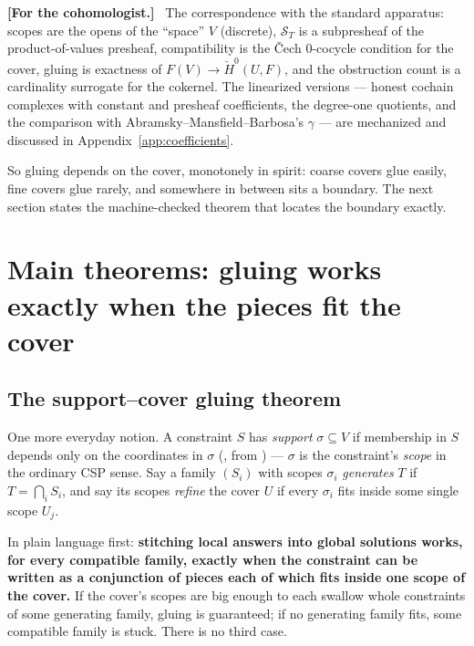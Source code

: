\documentclass[11pt]{article}
\newenvironment{cohomaside}
  {\par\medskip\noindent\begingroup\small
   \textbf{[For the cohomologist.]}\ }
  {\endgroup\par\medskip}
\newcommand{\Sec}{\mathcal S}
\newcommand{\Hech}{\check H}
\begin{document}
\begin{cohomaside}
The correspondence with the standard apparatus: scopes are the opens
of the ``space'' $V$ (discrete), $\Sec_T$ is a subpresheaf of the
product-of-values presheaf, compatibility is the \v{C}ech
$0$-cocycle condition for the cover, gluing is exactness of $F(V)
\to \Hech^0(U, F)$, and the obstruction count is a cardinality
surrogate for the cokernel.  The linearized versions --- honest
cochain complexes with constant and presheaf coefficients, the
degree-one quotients, and the comparison with
Abramsky--Mansfield--Barbosa's $\gamma$ --- are mechanized and
discussed in Appendix~\ref{app:coefficients}.
\end{cohomaside}

So gluing depends on the cover, monotonely in spirit: coarse covers
glue easily, fine covers glue rarely, and somewhere in between sits a
boundary.  The next section states the machine-checked theorem that
locates the boundary exactly.

\section{Main theorems: gluing works exactly when the pieces fit the
cover}
\label{sec:main}

\subsection{The support--cover gluing theorem}
\label{sec:supportcover}

One more everyday notion.  A constraint $S$ has \emph{support}
$\sigma \subseteq V$ if membership in $S$ depends only on the
coordinates in $\sigma$ (, from )
--- $\sigma$ is the constraint's \emph{scope} in the ordinary CSP
sense.  Say a family $(S_i)$ with scopes $\sigma_i$ \emph{generates}
$T$ if $T = \bigcap_i S_i$, and say its scopes \emph{refine} the
cover $U$ if every $\sigma_i$ fits inside some single scope $U_j$.

In plain language first: \textbf{stitching local answers into global
solutions works, for every compatible family, exactly when the
constraint can be written as a conjunction of pieces each of which
fits inside one scope of the cover.}  If the cover's scopes are big
enough to each swallow whole constraints of some generating family,
gluing is guaranteed; if no generating family fits, some compatible
family is stuck.  There is no third case.
\end{document}
